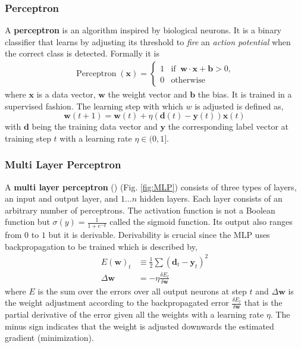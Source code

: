 \subsubsection{Perceptron}
  A \textbf{perceptron} is an algorithm inspired by biological neurons. It is a binary classifier that learns by adjusting its threshold to \emph{fire} an \emph{action potential} when the correct class is detected. Formally it is
  \begin{gather}
    \operatorname{Perceptron}(\mathbf{x}) = \begin{cases}1 & \text{if }\ \mathbf{w} \cdot \mathbf{x} + \mathbf{b} > 0,\\
    0 & \text{otherwise}\end{cases}
  \end{gather}
  where $\mathbf{x}$ is a data vector, $\mathbf{w}$ the weight vector and $\mathbf{b}$ the bias. It is trained in a supervised fashion. The learning step with which $w$ is adjusted is defined as,
  \[\mathbf{w}(t+1) = \mathbf{w}(t) + \eta (\mathbf{d}(t) - \mathbf{y}(t))\mathbf{x}(t)\]
  with $\mathbf{d}$ being the training data vector and $\mathbf{y}$ the corresponding label vector at training step $t$ with a learning rate $\eta \in (0,1]$.

\subsubsection{Multi Layer Perceptron}
  A \textbf{multi layer perceptron} () (Fig. \ref{fig:MLP}) consists of three types of layers, an input and output layer, and $1 \dots n$ hidden layers.
  Each layer consists of an arbitrary number of perceptrons.
  The activation function is not a Boolean function but $\sigma(y) = \frac{1}{1+e^{-y}}$ called the sigmoid function.
  Its output also ranges from $0$ to $1$ but it is derivable.
  Derivability is crucial since the MLP uses backpropagation to be trained which is described by,
  \begin{align}
    E(\mathbf{w})_t &\equiv \frac{1}{2} \sum (\mathbf{d}_t - \mathbf{y}_t)^2 \\
    \Delta \mathbf{w} &= - \eta \frac{\delta E_t}{\delta \mathbf{w}}
  \end{align}
  where $E$ is the sum over the errors over all output neurons at step $t$ and $\Delta \mathbf{w}$ is the weight adjustment according to the backpropagated error $\frac{\delta E_t}{\delta \mathbf{w}}$ that is the partial derivative of the error given all the weights with a learning rate $\eta$.
  The minus sign indicates that the weight is adjusted downwards the estimated gradient (minimization).


